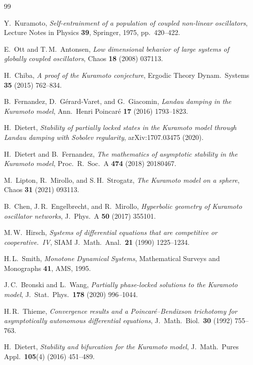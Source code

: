 \documentclass[11pt,a4paper]{article}
\theoremstyle{definition}
\begin{document}
\begin{thebibliography}{99}

Y.~Kuramoto, \emph{Self-entrainment of a population of coupled non-linear oscillators}, Lecture Notes in Physics \textbf{39}, Springer, 1975, pp.~420--422.

E.~Ott and T.\,M.~Antonsen, \emph{Low dimensional behavior of large systems of globally coupled oscillators}, Chaos \textbf{18} (2008) 037113.

H.~Chiba, \emph{A proof of the Kuramoto conjecture}, Ergodic Theory Dynam.\ Systems \textbf{35} (2015) 762--834.

B.~Fernandez, D.~G\'erard-Varet, and G.~Giacomin, \emph{Landau damping in the Kuramoto model}, Ann.\ Henri Poincar\'e \textbf{17} (2016) 1793--1823.

H.~Dietert, \emph{Stability of partially locked states in the Kuramoto model through Landau damping with Sobolev regularity}, arXiv:1707.03475 (2020).

H.~Dietert and B.~Fernandez, \emph{The mathematics of asymptotic stability in the Kuramoto model}, Proc.\ R.\ Soc.\ A \textbf{474} (2018) 20180467.

M.~Lipton, R.~Mirollo, and S.\,H.~Strogatz, \emph{The Kuramoto model on a sphere}, Chaos \textbf{31} (2021) 093113.

B.~Chen, J.\,R.~Engelbrecht, and R.~Mirollo, \emph{Hyperbolic geometry of Kuramoto oscillator networks}, J.\ Phys.\ A \textbf{50} (2017) 355101.

M.\,W.~Hirsch, \emph{Systems of differential equations that are competitive or cooperative.\ IV}, SIAM J.\ Math.\ Anal.\ \textbf{21} (1990) 1225--1234.

H.\,L.~Smith, \emph{Monotone Dynamical Systems}, Mathematical Surveys and Monographs \textbf{41}, AMS, 1995.

J.\,C.~Bronski and L.~Wang, \emph{Partially phase-locked solutions to the Kuramoto model}, J.~Stat.\ Phys.\ \textbf{178} (2020) 996--1044.

H.\,R.~Thieme, \emph{Convergence results and a Poincar\'e--Bendixson trichotomy for asymptotically autonomous differential equations}, J.~Math.\ Biol.\ \textbf{30} (1992) 755--763.

H.~Dietert, \emph{Stability and bifurcation for the Kuramoto model}, J.~Math.\ Pures Appl.\ \textbf{105}(4) (2016) 451--489.


\end{thebibliography}
\end{document}
